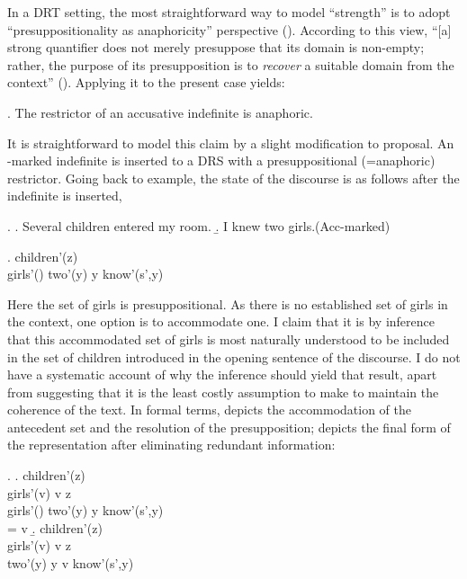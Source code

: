 \documentclass[11pt,a4paper]{article}
\begin{document}
In a DRT setting, the most straightforward way to model ``strength'' is to
adopt ``presuppositionality as anaphoricity'' perspective
().  According to this view, ``[a] strong quantifier
does not merely presuppose that its domain is non-empty; rather, the purpose of
its presupposition is to \emph{recover} a suitable domain from the context''
(). Applying it to the present case yields:

\ex. The restrictor of an accusative indefinite is anaphoric.


It is straightforward to model this claim by a slight modification to
 proposal. An \acc-marked indefinite is inserted to a DRS with a
presuppositional (=anaphoric) restrictor.  Going back to  example,
the state of the discourse is as follows after the indefinite is inserted,

\ex.
\a. Several children entered my room.
\b. I knew two girls.\hfill (Acc-marked)

\ex.
{children'(z)\\
girls'() \quad two'(y) \quad y \subseteq {} \quad know'(s',y)
}

Here the set of girls is presuppositional. As there is no established set of
girls in the context, one option is to accommodate one. I claim that it is by
inference that this accommodated set of girls is most naturally understood to
be included in the set of children introduced in the opening sentence of the
discourse. I do not have a systematic account of why the inference should yield
that result, apart from suggesting that it is the least costly assumption to
make to maintain the coherence of the text.  In formal terms, 
depicts the accommodation of the antecedent set and the resolution of the
presupposition;  depicts the final form of the representation
after eliminating redundant information:

\ex. 
\a.\label{prencaccom}
{children'(z)\\
girls'(v) \quad v \subseteq z\\
girls'() \quad two'(y) \quad y \subseteq {} \quad know'(s',y)\\
 = v
}
\b.\label{prencfin}
{children'(z)\\
girls'(v) \quad v \subseteq z\\
 two'(y) \quad y \subseteq v \quad know'(s',y)
}
\end{document}
